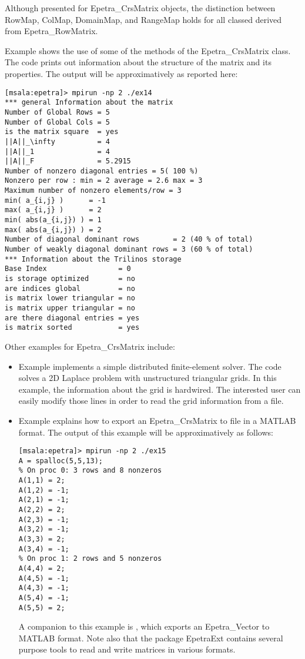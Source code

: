 \begin{remark}
Although presented for Epetra\_CrsMatrix objects, the distinction
between RowMap, ColMap, DomainMap, and RangeMap holds for all classed
derived from Epetra\_RowMatrix. 
\end{remark}


\medskip

Example  shows the use of some of the methods of
the Epetra\_CrsMatrix class. The code prints out information about the
structure of the matrix and its properties.  The output will be
approximatively as
reported here:
\begin{verbatim}
[msala:epetra]> mpirun -np 2 ./ex14
*** general Information about the matrix
Number of Global Rows = 5
Number of Global Cols = 5
is the matrix square  = yes
||A||_\infty          = 4
||A||_1               = 4
||A||_F               = 5.2915
Number of nonzero diagonal entries = 5( 100 %)
Nonzero per row : min = 2 average = 2.6 max = 3
Maximum number of nonzero elements/row = 3
min( a_{i,j} )      = -1
max( a_{i,j} )      = 2
min( abs(a_{i,j}) ) = 1
max( abs(a_{i,j}) ) = 2
Number of diagonal dominant rows        = 2 (40 % of total)
Number of weakly diagonal dominant rows = 3 (60 % of total)
*** Information about the Trilinos storage
Base Index                 = 0
is storage optimized       = no
are indices global         = no
is matrix lower triangular = no
is matrix upper triangular = no
are there diagonal entries = yes
is matrix sorted           = yes
\end{verbatim}

Other examples for Epetra\_CrsMatrix include:
\begin{itemize}
\item Example  implements a simple distributed
  finite-element solver.  The code solves a 2D Laplace problem with
  unstructured triangular grids. In this example, the information about
  the grid is hardwired.  The interested user can easily modify those
  lines in order to read the grid information from a file.
\item Example  explains how to export an
  Epetra\_CrsMatrix to file in a MATLAB format.  The output of this
  example will be approximatively  as follows:
\begin{verbatim}
[msala:epetra]> mpirun -np 2 ./ex15
A = spalloc(5,5,13);
% On proc 0: 3 rows and 8 nonzeros
A(1,1) = 2;
A(1,2) = -1;
A(2,1) = -1;
A(2,2) = 2;
A(2,3) = -1;
A(3,2) = -1;
A(3,3) = 2;
A(3,4) = -1;
% On proc 1: 2 rows and 5 nonzeros
A(4,4) = 2;
A(4,5) = -1;
A(4,3) = -1;
A(5,4) = -1;
A(5,5) = 2;
\end{verbatim}
  A companion to this example is \newline {},
  which exports an Epetra\_Vector to MATLAB format. Note also that the
  package EpetraExt contains several purpose tools to read and write
  matrices in various formats.
\end{itemize}

